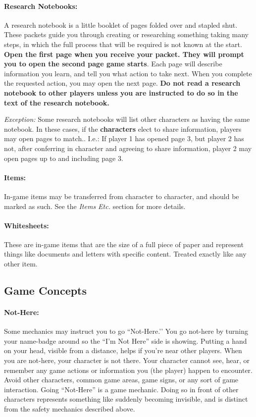 \documentclass[sheet]{GL2020}
\begin{document}
\paragraph{Research Notebooks:} A research notebook is a little booklet of pages folded over and stapled shut. These packets guide you through creating or researching something taking many steps, in which the full process that will be required is not known at the start. \textbf{Open the first page when you receive your packet. They will prompt you to open the second page game starts}. Each page will describe information you learn, and tell you what action to take next. When you complete the requested action, you may open the next page. \textbf{Do not read a research notebook to other players unless you are instructed to do so in the text of the research notebook.}

\emph{Exception:} Some research notebooks will list other characters as having the same notebook. In these cases, if the \textbf{characters} elect to share information, players may open pages to match.. I.e.: If player 1 has opened page 3, but player 2 has not, after conferring in character and agreeing to share information, player 2 may open pages up to and including page 3.

\paragraph{Items:} In-game items may be transferred from character to character, and should be marked as such. See the \emph{Items Etc.} section for more details.

\paragraph{Whitesheets:} These are in-game items that are the size of a full piece of paper and represent things like documents and letters with specific content. Treated exactly like any other item.

\subsection{Game Concepts}

\paragraph{Not-Here:} Some mechanics may instruct you to go ``Not-Here.'’ You go not-here by turning your name-badge around so the ``I'm Not Here'' side is showing. Putting a hand on your head, visible from a distance, helps if you're near other players. When you are not-here, your character is not there. Your character cannot see, hear, or remember any game actions or information you (the player) happen to encounter. Avoid other characters, common game areas, game signs, or any sort of game interaction. Going ``Not-Here'' is a game mechanic. Doing so in front of other characters represents something like suddenly becoming invisible, and is distinct from the safety mechanics described above.
\end{document}
